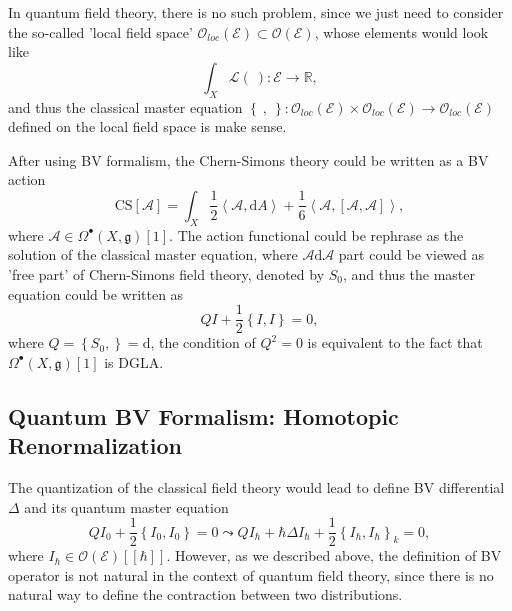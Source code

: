 \documentclass[10pt]{article}
\begin{document}
In quantum field theory, there is no such problem, since we just need to consider the so-called 'local field space' $ \mathcal{O}_{loc}(\mathcal{E}) \subset \mathcal{O}(\mathcal{E})$, whose elements would look like
\begin{equation*}
  \int _{X} \mathcal{L}(~): \mathcal{E} \rightarrow \mathbb{R},
\end{equation*}
and thus the classical master equation $\left\{ ~, ~ \right\} : \mathcal{O}_{loc}(\mathcal{E}) \times \mathcal{O}_{loc}(\mathcal{E}) \rightarrow \mathcal{O}_{loc}(\mathcal{E})$ defined on the local field space is make sense.
\begin{example}
  After using BV formalism, the Chern-Simons theory could be written as a BV action
  \begin{equation*}
    \mathrm{CS}[\mathcal{A}] = \int _{X} \frac{1}{2} \left< \mathcal{A}, \mathrm{d} A \right> + \frac{1}{6} \left< \mathcal{A}, [\mathcal{A}, \mathcal{A}] \right>,
  \end{equation*}
  where $ \mathcal{A} \in \Omega^{\bullet}(X, \mathfrak{g})[1]$. The action functional could be rephrase as the solution of the classical master equation, where $ \mathcal{A}\mathrm{d} \mathcal{A}$ part could be viewed as 'free part' of Chern-Simons field theory, denoted by $ S_0$, and thus the master equation could be written as
  \begin{equation*}
    Q I + \frac{1}{2} \left\{ I, I \right\} = 0,
  \end{equation*}
  where $ Q = \left\{ S_0,  \right\} = \mathrm{d}$, the condition of $ Q^{2} = 0$ is equivalent to the fact that $ \Omega^{\bullet}(X, \mathfrak{g})[1]$ is DGLA.
\end{example}

\subsection{Quantum BV Formalism: Homotopic Renormalization}

The quantization of the classical field theory would lead to define BV differential $ \Delta$ and its quantum master equation
\begin{equation*}
  Q I_0 + \frac{1}{2} \left\{ I_0, I_0 \right\} = 0 \leadsto Q I_{\hbar} + \hbar \Delta I_{\hbar} + \frac{1}{2} \left\{ I_{\hbar}, I_{\hbar} \right\}_{k} = 0,
\end{equation*}
where $ I_{\hbar} \in \mathcal{O}(\mathcal{E})[[\hbar]]$.
However, as we described above, the definition of BV operator is not natural in the context of quantum field theory, since there is no natural way to define the contraction between two distributions.
\end{document}
